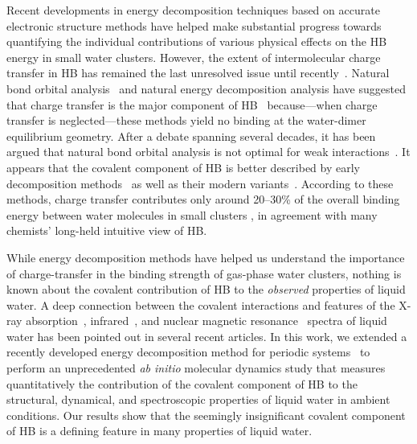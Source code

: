 \documentclass[aps,prl,reprint,amsmath,amssymb]{revtex4-1}
\begin{document}
Recent developments in energy decomposition techniques based on accurate electronic structure methods have helped make substantial progress towards quantifying the individual contributions of various physical effects on the HB energy in small water clusters. 
However, the extent of intermolecular charge transfer in HB has remained the last unresolved issue until recently~\cite{isaacs1999covalency,ghanty2000hydrogen,stone2017natural}. 
Natural bond orbital analysis~\cite{weinhold1998natural} and natural energy decomposition analysis \cite{glendening1994natural} have suggested that charge transfer is the major component of HB~\cite{schenter1996natural,glendening2005natural,weinhold2005resonance} because---when charge transfer is neglected---these methods yield no binding at the water-dimer equilibrium geometry. 
After a debate spanning several decades, it has been argued that natural bond orbital analysis is not optimal for weak interactions~\cite{stone2017natural}.
It appears that the covalent component of HB is better described by early decomposition methods~\cite{kitaura1976new,bagus1984new,bagus1992decomposition,stevens1987frozen,chen1996energy,stone1993computation} as well as their modern variants~\cite{mo2000energy,misquitta2013charge,khaliullin2007unravelling,misquitta2013charge}. 
According to these methods, charge transfer contributes only around 20--30\% of the overall binding energy between water molecules in small clusters \cite{stevens1987frozen,stone1993computation,chen1996energy,piquemal2005csov,khaliullin2009electron,cobar2012examination}, in agreement with many chemists' long-held intuitive view of HB.


While energy decomposition methods have helped us understand the importance of charge-transfer in the binding strength of gas-phase water clusters, nothing is known about the covalent contribution of HB to the \emph{observed} properties of liquid water. 
A deep connection between the covalent interactions and features of the X-ray absorption~\cite{NatureComm2013}, infrared~\cite{JPCL2013}, and nuclear magnetic resonance~\cite{NatureComm2015} spectra of liquid water has been pointed out in several recent articles. 
In this work, we extended a recently developed energy decomposition method for periodic systems~\cite{Khaliullin2013JCTC} to perform an unprecedented \emph{ab initio} molecular dynamics study that measures quantitatively the contribution of the covalent component of HB to the structural, dynamical, and spectroscopic properties of liquid water in ambient conditions. 
Our results show that the seemingly insignificant covalent component of HB is a defining feature in many properties of liquid water. 
\end{document}
